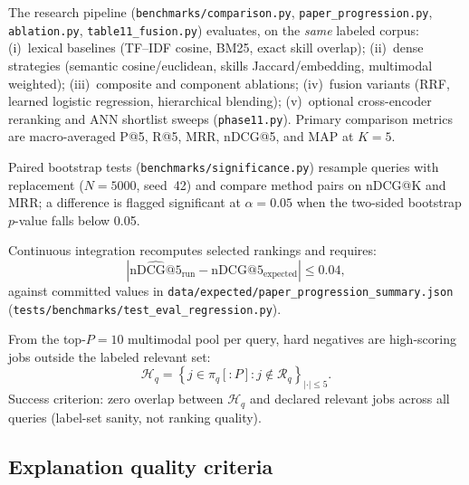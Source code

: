 The research pipeline (\texttt{benchmarks/comparison.py}, \texttt{paper\_progression.py}, \texttt{ablation.py}, \texttt{table11\_fusion.py}) evaluates, on the \emph{same} labeled corpus:
(i)~lexical baselines (TF--IDF cosine, BM25, exact skill overlap);
(ii)~dense strategies (semantic cosine/euclidean, skills Jaccard/embedding, multimodal weighted);
(iii)~composite and component ablations;
(iv)~fusion variants (RRF, learned logistic regression, hierarchical blending);
(v)~optional cross-encoder reranking and ANN shortlist sweeps (\texttt{phase11.py}).
Primary comparison metrics are macro-averaged P@5, R@5, MRR, nDCG@5, and MAP at $K{=}5$.

Paired bootstrap tests (\texttt{benchmarks/significance.py}) resample queries with replacement ($N{=}5000$, seed~42) and compare method pairs on nDCG@K and MRR; a difference is flagged significant at $\alpha{=}0.05$ when the two-sided bootstrap $p$-value falls below 0.05.

Continuous integration recomputes selected rankings and requires:
\begin{equation}
  \left| \widehat{\mathrm{nDCG@}5}_{\mathrm{run}} - \mathrm{nDCG@}5_{\mathrm{expected}} \right| \leq 0.04,
  \label{eq:regression}
\end{equation}
against committed values in \texttt{data/expected/paper\_progression\_summary.json} (\texttt{tests/benchmarks/test\_eval\_regression.py}).

From the top-$P{=}10$ multimodal pool per query, hard negatives are high-scoring jobs outside the labeled relevant set:
\begin{equation}
  \mathcal{H}_q = \left\{ j \in \pi_q[:P] : j \notin \mathcal{R}_q \right\}_{|\cdot|\leq 5}.
  \label{eq:hard-negs}
\end{equation}
Success criterion: zero overlap between $\mathcal{H}_q$ and declared relevant jobs across all queries (label-set sanity, not ranking quality).


\subsection{Explanation quality criteria}\label{sec:5-explainability}

